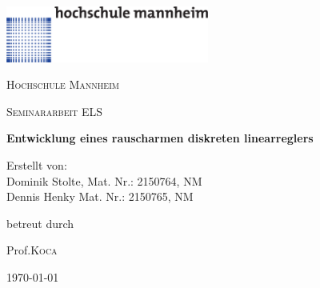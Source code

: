 \begin{titlepage}

  \includegraphics[width=0.5\textwidth]{../common/hsma-logo.pdf}\par\vspace{1cm}
  \centering
	{\scshape\LARGE Hochschule Mannheim \par}
	\vspace{1cm}
	{\scshape\Large Seminararbeit ELS\par}
	\vspace{1.5cm}
	{\huge\bfseries Entwicklung eines rauscharmen diskreten linearreglers\par}
	\vspace{2cm}
	{\Large Erstellt von:\\
	Dominik Stolte, Mat. Nr.: 2150764, NM\\ 
	Dennis Henky Mat. Nr.: 2150765, NM\par}
	\vfill
	betreut durch\par
	Prof.\textsc{Koca}
	\vfill
	{\large \today\par}
\end{titlepage}